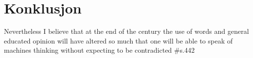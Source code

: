 \section{Konklusjon}

\begin{pquotation}{\autocite{Turing1950}}
    Nevertheless I believe that at the
    end of the century the use of words and general educated opinion will have
    altered so much that one will be able to speak of machines thinking without
    expecting to be contradicted #s.442
\end{pquotation}
